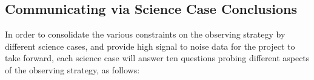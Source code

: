 
\subsection{Communicating via Science Case Conclusions}
\label{sec:\secname:caseConclusions}


In order to consolidate the various constraints on the observing
strategy by different science cases, and provide high signal to noise
data for the project to take forward, each science case will answer ten
questions probing different aspects of the observing strategy, as
follows:

%
%
%
